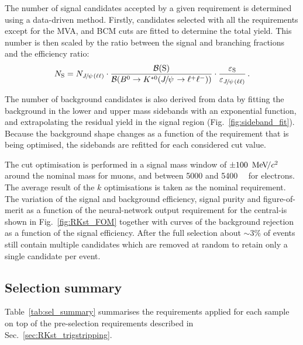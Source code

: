 The number of signal candidates accepted by a given requirement is determined using a data-driven method.
Firstly, \mbox{\BdToKstJPsll} candidates selected with all the requirements except for the MVA, and BCM cuts 
are fitted to determine the total yield. 
This number is then scaled by the ratio between the signal and \mbox{\BdToKstJPsll} branching fractions and
the efficiency ratio: 
%
$$N_{\mathrm{S}} = N_{\jpsi(\ell\ell)} \cdot
\frac{\BR(\mathrm{S})}{\BR(\BdToKstJPsll)} \cdot
\frac{\varepsilon_{\mathrm{S}}}{\varepsilon_{\jpsi(\ell\ell)}} \, .$$

The number of background candidates is also derived from data by fitting the background in the lower and upper 
mass sidebands with an exponential function, and extrapolating the residual yield in the signal region (Fig.~\ref{fig:sideband_fit}).
Because the background shape changes as a function of the requirement that is being optimised, the sidebands are refitted for each considered cut value.
%

The cut optimisation is performed in a signal mass window of $\pm100~{\mathrm{\,Me\kern -0.1em V\!/}c^2}$ around the nominal \Bz mass for muons, and between 5000 and 5400~\mevcc~ for electrons.
The average result of the $k$ optimisations is taken as the nominal requirement.
%
%
%
The variation of the signal and background efficiency, signal purity and figure-of-merit as a function of the neural-network output
requirement for the central-\qsq is shown in Fig.~\ref{fig:RKst_FOM}
together with curves of the background rejection as a function of the signal efficiency.
%
%
After the full selection about $\sim 3\%$ of events still contain multiple candidates
which are removed at random to retain only a single candidate per event.

\clearpage

\subsection{Selection summary}

Table~\ref{tab:sel_summary} summarises the requirements applied for each sample 
on top of the pre-selection requirements described in Sec.~\ref{sec:RKst_trigstripping}.

